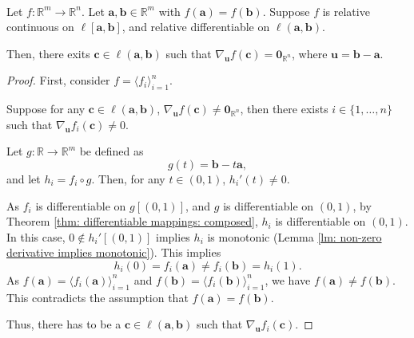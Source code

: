 \begin{lemma}
	 \
	\label{lm: rolle's theorem}
	
	Let $f: \mathbb R^m \to \mathbb R^n$. Let $\mathbf a, \mathbf b \in \mathbb R^m$ with $f(\mathbf a) = f(\mathbf b)$. Suppose $f$ is relative continuous on $\ell[\mathbf a, \mathbf b]$, and relative differentiable on $\ell(\mathbf a, \mathbf b)$. 
	
	Then, there exits $\mathbf c \in \ell(\mathbf a, \mathbf b)$ such that $\nabla_{\mathbf u} f(\mathbf c) = \mathbf 0_{\mathbb R^n}$, where $\mathbf u = \mathbf b - \mathbf a$.
	
	\begin{proof}
		First, consider $f = \langle f_i \rangle_{i = 1}^n$.
		
		Suppose for any $\mathbf c \in \ell(\mathbf a, \mathbf b)$, $\nabla_{\mathbf u} f(\mathbf c) \ne \mathbf 0_{\mathbb R^n}$, then there exists $i \in \{1, \ldots, n\}$ such that $\nabla_{\mathbf u}f_i(\mathbf c) \ne 0$.
		
		Let $g: \mathbb R \to \mathbb R^m$ be defined as
		$$
		g(t) = \mathbf b - t\mathbf a,
		$$
		and let $h_i = f_i \circ g$. Then, for any $t \in (0, 1)$, $h_i'(t) \ne 0$.
		
		As $f_i$ is differentiable on $g[(0,1)]$, and $g$ is differentiable on $(0,1)$, by Theorem \ref{thm: differentiable mappings: composed}, $h_i$ is differentiable on $(0,1)$. In this case, $0 \notin h_i'[(0,1)]$ implies $h_i$ is monotonic (Lemma \ref{lm: non-zero derivative implies monotonic}). This implies
		$$
		h_i(0) = f_i(\mathbf a) \ne f_i(\mathbf b) = h_i(1).
		$$
		As $f(\mathbf a) = \langle f_i(\mathbf a) \rangle_{i = 1}^n$ and $f(\mathbf b) = \langle f_i(\mathbf b) \rangle_{i = 1}^n$, we have $f(\mathbf a) \ne f(\mathbf b)$. This contradicts the assumption that $f(\mathbf a) = f(\mathbf b)$.
		
		Thus, there has to be a $\mathbf c \in \ell(\mathbf a, \mathbf b)$ such that $\nabla_{\mathbf u} f_i(\mathbf c)$.
	\end{proof}
\end{lemma}


